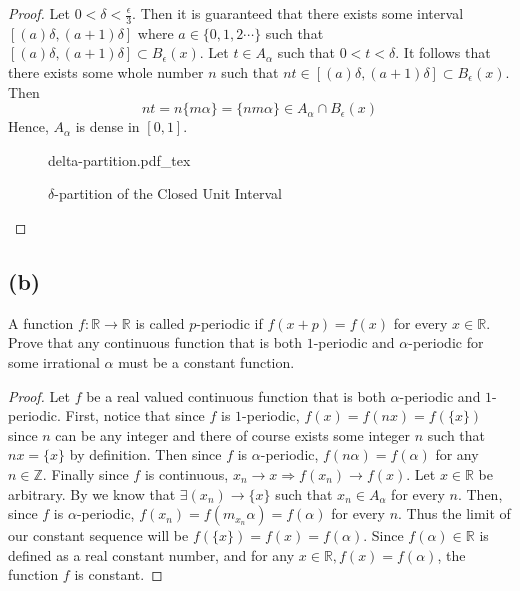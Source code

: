 \documentclass{article}
\begin{document}
\begin{proof}
            Let $0 < \delta < \frac{\epsilon}{3}$. Then it is guaranteed that there exists some interval $[(a) \delta, (a+1)\delta]$ where $a \in \{0,1,2\cdots\}$
            such that $[(a)\delta, (a+1)\delta] \subset B_\epsilon(x)$. Let $t \in A_\alpha$ such that $0 < t < \delta$.
            It follows that there exists some whole number $n$ such that $nt \in [(a)\delta, (a+1)\delta] \subset B_\epsilon(x)$. Then 
            \[
                nt = n\{m\alpha\} = \{ n m \alpha\} \in A_\alpha \cap B_\epsilon(x)
            \]
            Hence, $A_\alpha$ is dense in $[0,1]$.
            \begin{figure}[hbt!]
                \centering
                \def\svgwidth{.5\linewidth}
                {delta-partition.pdf_tex}
                \caption{$\delta$-partition of the Closed Unit Interval}
                \label{fig:delta-partition}
            \end{figure}
        \end{proof}
    \subsection*{(b)}
        A function $f: \mathbb{R} \rightarrow \mathbb{R}$ is called $p$-periodic if $f(x+p) = f(x)$ for every
        $x \in \mathbb{R}$. Prove that any continuous function that is both $1$-periodic and $\alpha$-periodic for
        some irrational $\alpha$ must be a constant function.
        \begin{proof}
            Let $f$ be a real valued continuous function that is both $\alpha$-periodic and $1$-periodic. First, notice that since 
            $f$ is $1$-periodic, $f(x) = f(nx) = f(\{x\})$ since $n$ can be any integer and there of course exists some integer $n$ such
            that $nx = \{x\}$ by definition. Then since $f$ is $\alpha$-periodic, $f(n\alpha) = f(\alpha)$ for any $n \in \mathbb{Z}$.
            Finally since $f$ is continuous, $x_n \rightarrow x \Rightarrow f(x_n) \rightarrow f(x)$.
            Let $x \in \mathbb{R}$ be arbitrary.
            By  we know that $\exists (x_n) \rightarrow \{x\}$ such that $x_n \in A_\alpha$ for every $n$.
            Then, since $f$ is $\alpha$-periodic, $f(x_n) = f(m_{x_n}\alpha) = f(\alpha)$ for every $n$. Thus the limit of our constant sequence will be $f(\{x\}) = f(x) = f(\alpha)$.
            Since $f(\alpha) \in \mathbb{R}$ is defined as a real constant number, and for any $x \in \mathbb{R}, f(x) = f(\alpha)$, the function $f$ is constant.
        \end{proof}
\end{document}
